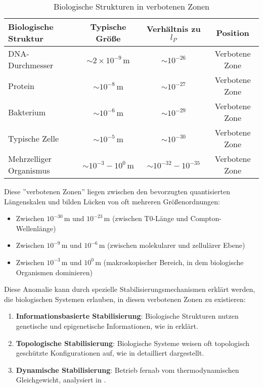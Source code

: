 \documentclass[12pt,a4paper]{article}
\begin{document}
\begin{table}[H]
	\centering
	\begin{tabular}{lccc}
		\toprule
		\textbf{Biologische Struktur} & \textbf{Typische Größe} & \textbf{Verhältnis zu \(l_P\)} & \textbf{Position} \\
		\midrule
		DNA-Durchmesser & \(\sim 2 \times 10^{-9} \, \text{m}\) & \(\sim 10^{-26}\) & Verbotene Zone \\
		Protein & \(\sim 10^{-8} \, \text{m}\) & \(\sim 10^{-27}\) & Verbotene Zone \\
		Bakterium & \(\sim 10^{-6} \, \text{m}\) & \(\sim 10^{-29}\) & Verbotene Zone \\
		Typische Zelle & \(\sim 10^{-5} \, \text{m}\) & \(\sim 10^{-30}\) & Verbotene Zone \\
		Mehrzelliger Organismus & \(\sim 10^{-3} - 10^{0} \, \text{m}\) & \(\sim 10^{-32} - 10^{-35}\) & Verbotene Zone \\
		\bottomrule
	\end{tabular}
	\caption{Biologische Strukturen in verbotenen Zonen}
	\label{tab:biological_anomalies}
\end{table}

Diese ''verbotenen Zonen'' liegen zwischen den bevorzugten quantisierten Längenskalen und bilden Lücken von oft mehreren Größenordnungen:
\begin{itemize}
	\item Zwischen \(10^{-30} \, \text{m}\) und \(10^{-23} \, \text{m}\) (zwischen T0-Länge und Compton-Wellenlänge)
	\item Zwischen \(10^{-9} \, \text{m}\) und \(10^{-6} \, \text{m}\) (zwischen molekularer und zellulärer Ebene)
	\item Zwischen \(10^{-3} \, \text{m}\) und \(10^{0} \, \text{m}\) (makroskopischer Bereich, in dem biologische Organismen dominieren)
\end{itemize}

Diese Anomalie kann durch spezielle Stabilisierungsmechanismen erklärt werden, die biologischen Systemen erlauben, in diesen verbotenen Zonen zu existieren:

\begin{enumerate}
	\item \textbf{Informationsbasierte Stabilisierung}: Biologische Strukturen nutzen genetische und epigenetische Informationen, wie in \cite{pascher_bio_2025} erklärt.
	\item \textbf{Topologische Stabilisierung}: Biologische Systeme weisen oft topologisch geschützte Konfigurationen auf, wie in \cite{pascher_quantum_2025} detailliert dargestellt.
	\item \textbf{Dynamische Stabilisierung}: Betrieb fernab vom thermodynamischen Gleichgewicht, analysiert in \cite{pascher_galaxies_2025}.
\end{enumerate}
\end{document}
